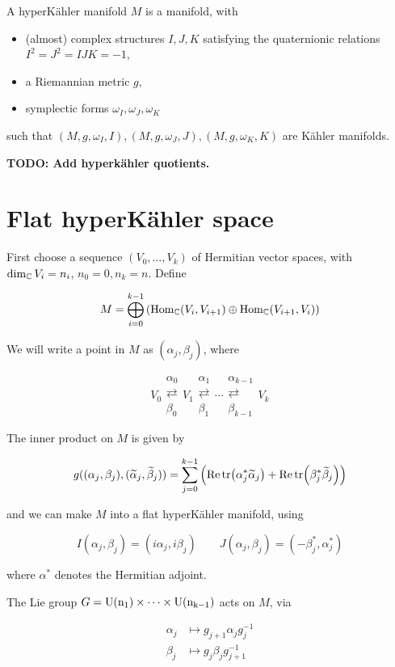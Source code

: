 \documentclass{report}
\renewcommand{\tilde}{\widetilde}
\newcommand{\rla}{\rightleftarrows}
\newcommand{\rlamap}[1]{\mathrel{\substack{\alpha_{#1} \\ \rla \\ \beta_{#1}}}}
\begin{document}
\begin{definition}

    A hyperK\"ahler manifold \(M\) is a manifold, with 
    
    \begin{itemize}
        \item (almost) complex structures \(I, J, K\) satisfying the quaternionic relations \(I^2 = J^2 = IJK = -1\), 
        \item a Riemannian metric \(g\),
        \item symplectic forms \(\omega_I, \omega_J, \omega_K\)
    \end{itemize}

    such that \((M, g, \omega_I, I), (M, g, \omega_J, J), (M, g, \omega_K, K)\) are K\"ahler manifolds.
\end{definition}

\textbf{TODO: Add hyperk\"ahler quotients.}

\section{Flat hyperK\"ahler space}

First choose a sequence \((V_0, \dots, V_k)\) of Hermitian vector spaces, with \(\dim_{\mathbb{C}} V_i = n_i\), \(n_0 = 0, n_k = n\). Define

\[M = \bigoplus_{i=0}^{k-1}\left(\operatorname{Hom}_{\mathbb{C}}(V_i, V_{i+1}) \oplus \operatorname{Hom}_{\mathbb{C}}(V_{i+1}, V_i)\right)\]

We will write a point in \(M\) as \((\alpha_j, \beta_j)\), where

\[V_0 \rlamap{0} V_1 \rlamap{1} \cdots \rlamap{k-1} V_k\]

The inner product on \(M\) is given by

\[g((\alpha_j, \beta_j), (\tilde\alpha_j, \tilde\beta_j)) = \sum_{j=0}^{k-1}\left(\Re\tr(\alpha_j^*\tilde\alpha_j) + \Re\tr(\beta_j^*\tilde\beta_j)\right)\]

and we can make \(M\) into a flat hyperK\"ahler manifold, using

\[I(\alpha_j, \beta_j) = (i\alpha_j, i\beta_j) \qquad J(\alpha_j, \beta_j) = (-\beta_j^*, \alpha_j^*)\]

where \(\alpha^*\) denotes the Hermitian adjoint.

The Lie group \(G = \rm U(n_1) \times \cdots \times \rm U(n_{k-1})\) acts on \(M\), via

\begin{equation}
    \begin{split}
        \alpha_j &\mapsto g_{j+1}\alpha_j g_j^{-1} \\
        \beta_j &\mapsto g_j\beta_j g_{j+1}^{-1}
    \end{split}
\end{equation}
\end{document}
